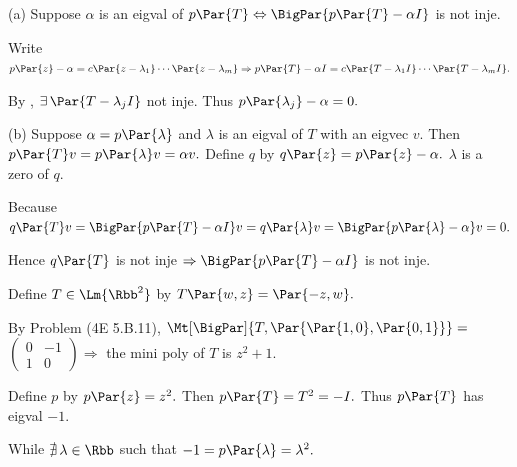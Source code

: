 \par\quad
(a) Suppose $\alpha$ is an eigval of $p\Par{T}\Leftrightarrow \BigPar{p\Par{T}-\alpha I}$ is not inje.\par\quad\Ha
Write $p\Par{z}-\alpha=c\Par{z-\lambda_1}\cdots\Par{z-\lambda_m}\Rightarrow p\Par{T}-\alpha I=c\Par{T-\lambda_1 I}\cdots\Par{T-\lambda_m I}.$\par\quad\Ha
By \TIPS, $\exists\,\Par{T-\lambda_j I}$ not inje. Thus $p\Par{\lambda_j}-\alpha=0.$\par\quad
(b) Suppose $\alpha=p\Par{\lambda}$ and $\lambda$ is an eigval of $T$ with an eigvec $v.$ Then $p\Par{T}v=p\Par{\lambda}v=\alpha v.$\PfEnd\vspace{3pt}\quad\Hb
\Or Define $q$ by $q\Par{z}=p\Par{z}-\alpha.$ $\lambda$ is a zero of $q.$\par\quad\Hb
Because $q\Par{T}v=\BigPar{p\Par{T}-\alpha I}v=q\Par{\lambda}v=\BigPar{p\Par{\lambda}-\alpha}v=0.$\par\quad\Hb
Hence $q\Par{T}$ is not inje $\Rightarrow \BigPar{p\Par{T}-\alpha I}$ is not inje.\PfEnd
\SepLine

\par\quad
Define $T\in\Lm{\Rbb^2}$ by $T\Par{w,z}=\Par{-z,w}.$\par\quad
By Problem (4E 5.B.11), $\Mt[\BigPar]{T,\Par{\Par{1,0},\Par{0,1}}}=\,${\small$\begin{pmatrix}0 & -1\\ 1 & 0\end{pmatrix}$}$\Rightarrow$ the mini poly of $T$ is $z^2+1.$\par\quad
Define $p$ by $p\Par{z}=z^2.$ Then $p\Par{T}=T^2=-I.$ Thus $p\Par{T}$ has eigval $-1.$\par\quad
While $\nexists\,\lambda\in\Rbb$ such that $-1=p\Par{\lambda}=\lambda^2.$\PfEnd
\SepLine

